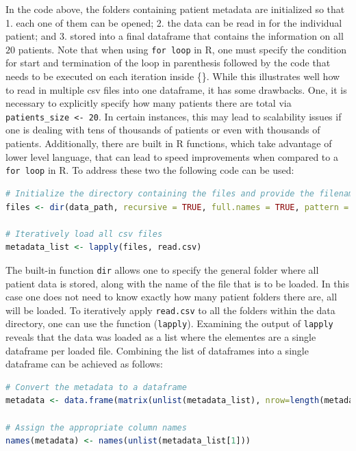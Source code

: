 In the code above, the folders containing patient metadata are initialized so that 1. each one of them can be opened; 2. the data can be read in for the individual patient; and 3. stored into a final dataframe that contains the information on all $20$ patients. Note that when using \verb|for loop| in R, one must specify the condition for start and termination of the loop in parenthesis followed by the code that needs to be executed on each iteration inside \{\}.
While this illustrates well how to read in multiple csv files into one dataframe, it has some drawbacks. One, it is necessary to explicitly specify how many patients there are total via \verb|patients_size <- 20|. In certain instances, this may lead to scalability issues if one is dealing with tens of thousands of patients or even with thousands of patients. Additionally, there are built in R functions, which take advantage of lower level language, that can lead to speed improvements when compared to a \verb|for loop| in R.
To address these two the following code can be used:
\begin{lstlisting}[language=R]
# Initialize the directory containing the files and provide the filenames within each folder
files <- dir(data_path, recursive = TRUE, full.names = TRUE, pattern = "metadata.csv$")

# Iteratively load all csv files
metadata_list <- lapply(files, read.csv)
\end{lstlisting}
The built-in function \verb|dir| allows one to specify the general folder where all patient data is stored, along with the name of the file that is to be loaded. In this case one does not need to know exactly how many patient folders there are, all will be loaded. To iteratively apply \verb|read.csv| to all the folders within the data directory, one can use the function (\verb|lapply|).
Examining the output of \verb|lapply| reveals that the data was loaded as a list where the elementes are a single dataframe per loaded file. Combining the list of dataframes into a single dataframe can be achieved as follows:
\begin{lstlisting}[language=R]
# Convert the metadata to a dataframe
metadata <- data.frame(matrix(unlist(metadata_list), nrow=length(metadata_list), byrow=TRUE), stringsAsFactors=FALSE)

# Assign the appropriate column names
names(metadata) <- names(unlist(metadata_list[1]))
\end{lstlisting}

